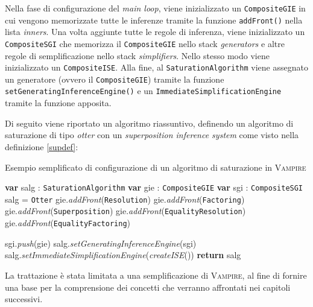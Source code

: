 Nella fase di configurazione del \emph{main loop}, viene inizializzato un \verb|CompositeGIE| in cui 
vengono memorizzate tutte le inferenze tramite la funzione \verb|addFront()| nella lista \emph{inners}.
Una volta aggiunte tutte le regole di inferenza, viene inizializzato un \verb|CompositeSGI| che memorizza
il \verb|CompositeGIE| nello stack \emph{generators} e altre regole di semplificazione nello stack \emph{simplifiers}.
Nello stesso modo viene inizializzato un \verb|CompositeISE|. Alla fine, al \verb|SaturationAlgorithm| viene assegnato un generatore (ovvero il \verb|CompositeGIE|)
tramite la funzione \verb|setGeneratingInferenceEngine()| e un \verb|ImmediateSimplificationEngine| tramite la funzione 
apposita. 
\clearpage
\begin{example}
    Di seguito viene riportato un algoritmo riassuntivo, definendo un algoritmo di saturazione di tipo \emph{otter} con un \emph{superposition inference system} come visto 
nella definizione \ref{supdef}:
\begin{algorithm}
    \caption{Esempio semplificato di configurazione di un algoritmo di saturazione in \textsc{Vampire}}
    \begin{algorithmic}
        \State \textbf{var} salg : \verb|SaturationAlgorithm|
        \State \textbf{var} gie : \verb|CompositeGIE|
        \State \textbf{var} sgi : \verb|CompositeSGI|
        \State salg = \verb|Otter|
        \State gie.\emph{addFront}(\verb|Resolution|)
        \State gie.\emph{addFront}(\verb|Factoring|)
        \State gie.\emph{addFront}(\verb|Superposition|)
        \State gie.\emph{addFront}(\verb|EqualityResolution|)
        \State gie.\emph{addFront}(\verb|EqualityFactoring|)

        \State sgi.\emph{push}(gie)
        \State salg.\emph{setGeneratingInferenceEngine}(sgi)
        \State salg.\emph{setImmediateSimplificationEngine}(\emph{createISE}())
        \State \textbf{return} salg
        \EndFunction
    \end{algorithmic}
\end{algorithm}
\end{example}
La trattazione è stata limitata a una semplificazione di \textsc{Vampire}, al fine di fornire una base 
per la comprensione dei concetti che verranno affrontati nei capitoli successivi. 

